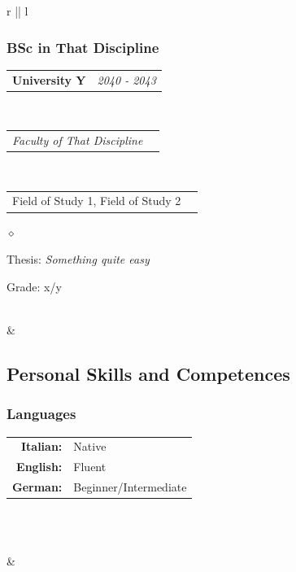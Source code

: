 \documentclass[a4paper]{article}
\makeatletter
\newlength{\sectsep}
\newlength{\subsectsep}
\newcommand{\headerrow}[2]
{\begin{tabular*}{\textwidth}{l@{\extracolsep{\fill}}r}
	#1 &
	#2 \\
\end{tabular*}}
\renewenvironment{itemize}{
  \begin{list}{$\diamond$}{
    \setlength{\topsep}{0.25em}
    \setlength{\itemsep}{0em}
    \setlength{\parskip}{0pt}
    \setlength{\parsep}{0em}
  }
}{
  \end{list}
}
\makeatother
\begin{document}
\begin{longtable}{r || l}
\begin{minipage}{0.9\textwidth}
      \subsubsection*{BSc in That Discipline}
      \headerrow
  		{\textbf{University Y}}{\emph{2040 - 2043}}
      \\
      \headerrow
        {\emph{Faculty of That Discipline}}{}
      \\
      \headerrow
        {Field of Study 1, Field of Study 2}{}

      \begin{itemize}
          \item Thesis: \emph{Something quite easy}
          \item Grade: x/y
      \end{itemize}
      \vfill
  \end{minipage} \\[\sectsep]

  & \begin{minipage}{0.9\textwidth}
      \vspace{\sectsep}
      \subsection*{Personal Skills and Competences}
      \subsubsection*{Languages}
      \begin{tabular}{rl}
        \textbf{Italian:}&Native\\
        \textbf{English:}&Fluent\\
        \textbf{German:}&Beginner/Intermediate\\
      \end{tabular} \vspace{1.5ex} \\
    \end{minipage} \\[\sectsep]

  & \begin{minipage}{0.9\textwidth}
      \vspace{\subsectsep}

\end{minipage}
\end{longtable}
\end{document}
